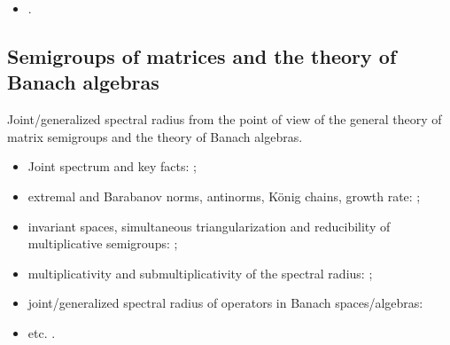 \begin{itemize}

\item \cite{Ahmadi08, AhmPar:CDC05, AndoShih:SIAM:98, AKKK:92:e, BerWang:LAA92, BE:EJLA97, BeynEls96, BrayTong:TCS79, BrayTong:TCS80, BEN:ETNA94, BTV:MTNS02, BZ:AMPA18, ChM:LAA69, CiconePhD11, Cohen:MPCPS79, DaubLag:LAA92, DaubLag:LAA01, EF:LAA97, FLS:ETDS19, GugZen:LAA01, GurRod:SIAMJMAA97, GugZen:LAA03, Hajnal:MPCPS76, Hartfiel02, Holtz:EJLA00, HR:APM12, JGC:SIAMJMAA14, KasBh:2000, Koz:AiT90:10:e, Koz:DDNS18, Koz:ArXiv20, Mate:PAMS98, Mate:FM99, Mojskerc:LAA14, NeuSch:ArXiv98, NSch:LAA99, PJ:LAA13, Shen:LAA00, Shih:LAA99, ShihPang:AJIFAC08, ShihWP:LAA97, SBKK:CDC97, SBKK:LAA98, SU:SIAMJMAA94, Szyld:TU98, Thomas:Arxiv18, Thomas:ArXiv22, Vlad:ArXiv16, WangCheng:LMA16}.
\end{itemize}

\subsection*{Semigroups of matrices and the theory of Banach algebras}
Joint/generalized spectral radius from the point of view of the general theory of matrix semigroups and the theory of Banach algebras.

\begin{itemize}

\item Joint spectrum and key facts: \cite{Bell:LAA05, BerWang:LAA92, BreSert:LMS21, EE:PAMS04, GurRod:SIAMJMAA97, Lur:LAA06-2, RS:PAMS95, Sert:CRMASP17};
\item extremal and Barabanov norms, antinorms, K\"{o}nig chains, growth rate: \cite{BCH:SF16, CMS:HAL21, Dai:JMAA11, GugProt:FCM13, GugZen:JMAA15, GugZen:LAA20, GLP:FCM15, GLP:FCM15, Jachymski:TAMS09, Koz:ArXiv21, LS:LAA02, MejProt:ArXiv21-2, Prot:LMA21, Prot:ArXiv21-2, Shih:LAA01};
\item invariant spaces, simultaneous triangularization and reducibility of multiplicative semigroups: \cite{Drnov:97, Drnovsek:SM97, Drn:IEOT01, GPRSTT:P10, Guinand:PAMS82, HNRRR:HJM91, LMMR:JOT98, OmRadj:LAA97, Prot:FPM96:e, Radj:IUMJ90, RRS:PAMS00, Szep:AMH86};
\item multiplicativity and submultiplicativity of the spectral radius: \cite{LR:CJM95, OmRadj:LAA97, ProtVoy:LAA17};
\item joint/generalized spectral radius of operators in Banach spaces/algebras: \cite{BD:ArXiv18, BF:ArXiv18, EE:PAMS04, KisShulTur:20, Morris:JFA12, Muller:APM97, Pep:LMA11, Peperko:LAA12, RS:PAMS95, ShulTur:ArXiv12, ShulTur:JFA00, ShulTur:SM02, Turovskii:JFA99, TurShul:FAP00, TurShul:FAP12}
\item etc. \cite{Javaheri:JMAA13, ManSim:TCS78}.
\end{itemize}

